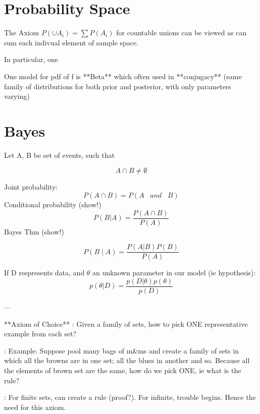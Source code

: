 \documentclass{article}
\begin{document}
\section{Probability Space}

The Axiom $P(\cup A_i) = \sum P(A_i)$ for countable unions can be viewed as
can sum each indivual element of sample space.

In particular, one 

One model for pdf   of f is **Beta**
which often used in **conjugacy** (same family of distributions for both prior
and posterior,  with only parameters varying)

\section{Bayes}

Let A, B be set of events, such that \

$$A \cap B \neq \emptyset$$

Joint probability: \
$$P(A \cap B) = P(A \hspace{10pt} and \hspace{10pt} B)$$
Conditional probability (show!) 
$$P(B \lvert A) = \frac{P(A \cap B)}{P(A)}$$
Bayes Thm (show!) \ 

$$P(B \mid A) = \frac{P(A \lvert B)P(B)}{P(A)}$$


If D respresents data, and $\theta$ an unknown parameter in our model (ie
hypothesis):
$$p(\theta | D) = \frac{p(D|\theta) p(\theta)} {p(D)}$$


---

**Axiom of Choice**
:	Given a family of sets, how to pick ONE representative example from each
set?	

:	Example:	Suppose pool many bags of m\&ms and create a family of sets in
which all the browns are in one set; all the blues in another and so.  Because
all the elements of brown set are the same, how do we pick ONE, ie what is the
rule?

:	For finite sets, can create a rule (proof?).  For infinite, trouble begins.
Hence the need for this axiom.  
\end{document}
